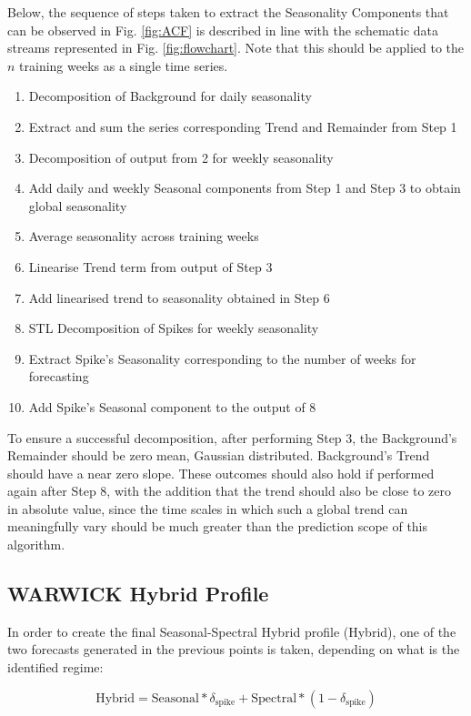 \documentclass[letterpaper, 10 pt, conference]{ieeeconf}  %
\begin{document}
Below, the sequence of steps taken to extract the Seasonality Components that can be observed in Fig. \ref{fig:ACF} is described in line with the schematic data streams represented in Fig. \ref{fig:flowchart}. 
Note that this should be applied to the $n$ training weeks as a single time series.
\begin{enumerate}
	\item Decomposition of Background for daily seasonality
	\item Extract and sum the series corresponding Trend and Remainder from Step 1
	\item Decomposition of output from 2 for weekly seasonality
	\item Add daily and weekly Seasonal components from Step 1 and Step 3 to obtain global seasonality
	\item Average seasonality across training weeks
	\item Linearise Trend term from output of Step 3
	\item Add linearised trend to seasonality obtained in Step 6
	\item STL Decomposition of Spikes for weekly seasonality
	\item Extract Spike's Seasonality corresponding to the number of weeks for forecasting
	\item Add Spike's Seasonal component to the output of 8
\end{enumerate}
To ensure a successful decomposition, after performing Step 3, the Background's Remainder should be zero mean, Gaussian distributed. Background's Trend should have a near zero slope. These outcomes should also hold if performed again after Step 8, with the addition that the trend should also be close to zero in absolute value, since the time scales in which such a global trend can meaningfully vary should be much greater than the prediction scope of this algorithm.
\subsection{WARWICK Hybrid Profile}
In order to create the final Seasonal-Spectral Hybrid profile (Hybrid), one of the two forecasts generated in the previous points is taken, depending on what is the identified regime: 

\begin{equation}
\textrm{Hybrid} = \textrm{Seasonal} * \delta_{\textrm{spike}} + \textrm{Spectral} * (1 - \delta_{\textrm{spike}})
\end{equation}
\end{document}
